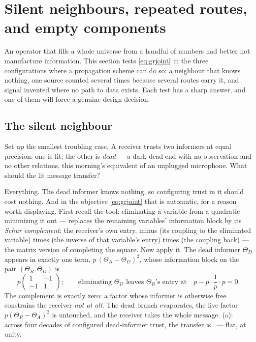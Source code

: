 \section{Silent neighbours, repeated routes, and empty components}
\label{sec:graccount}

An operator that fills a whole universe from a handful of numbers had
better not manufacture information.  This section tests
\cref{eq:grjoint} in the three configurations where a propagation
scheme can do so: a neighbour that knows nothing,
one source counted several times because several routes carry it, and
signal invented where no path to data exists.  Each test has a sharp
answer, and one of them will force a genuine design decision.

\subsection{The silent neighbour}

Set up the smallest troubling case.  A receiver trusts two informers
at equal precision: one is lit; the other is \emph{dead} --- a dark
dead-end with no observation and no other relations, this morning's
equivalent of an unplugged microphone.  What should the lit message
transfer?

Everything.  The dead informer knows nothing, so configuring trust in
it should cost nothing.  And in the objective \cref{eq:grjoint} that
is automatic, for a reason worth displaying.  First recall the tool:
eliminating a variable from a quadratic --- minimizing it out ---
replaces the remaining variables' information block by its
\emph{Schur complement}: the receiver's own entry, minus (its
coupling to the eliminated variable) times (the inverse of that
variable's entry) times (the coupling back) --- the matrix version of
completing the square.  Now apply it.  The dead informer
$\Theta_D$ appears in exactly one term,
$p\,(\Theta_R-\Theta_D)^{2}$, whose information block on the pair
$(\Theta_R,\Theta_D)$ is
\[
p\begin{pmatrix}1&-1\\-1&1\end{pmatrix};
\qquad\text{eliminating } \Theta_D \text{ leaves }
\Theta_R \text{'s entry at}\quad
p-p\cdot\frac{1}{p}\cdot p=0 .
\]
The complement is exactly zero: a factor
whose informer is otherwise free constrains the receiver \emph{not at
all}.  The dead branch evaporates, the live factor
$p(\Theta_R-\Theta_A)^{2}$ is untouched, and the receiver takes the
whole message.  (a): across four decades of
configured dead-informer trust, the transfer is
\MacGrDeadPairMin\ --- flat, at unity.

